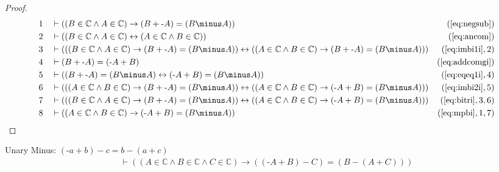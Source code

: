 \begin{proof}
\begin{align}
  1 &&  & \vdash ( ( B \in \mathbb{C} \wedge A \in \mathbb{C} ) \rightarrow ( B + \textrm{-} A ) = ( B \minus A ) )&(\mbox{\ref{eq:negsub}})\notag
  \\ 2 &&  & \vdash ( ( B \in \mathbb{C} \wedge A \in \mathbb{C} ) \leftrightarrow ( A \in \mathbb{C} \wedge B \in \mathbb{C} ) )&(\mbox{\ref{eq:ancom}})\notag
  \\ 3 &&  & \vdash ( ( ( B \in \mathbb{C} \wedge A \in \mathbb{C} ) \rightarrow ( B + \textrm{-} A ) = ( B \minus A ) ) \leftrightarrow ( ( A \in \mathbb{C} \wedge B \in \mathbb{C} ) \rightarrow ( B + \textrm{-} A ) = ( B \minus A ) ) )&(\mbox{\ref{eq:imbi1i}},2)\notag
  \\ 4 &&  & \vdash ( B + \textrm{-} A ) = ( \textrm{-} A + B )&(\mbox{\ref{eq:addcomgi}})\notag
  \\ 5 &&  & \vdash ( ( B + \textrm{-} A ) = ( B \minus A ) \leftrightarrow ( \textrm{-} A + B ) = ( B \minus A ) )&(\mbox{\ref{eq:eqeq1i}},4)\notag
  \\ 6 &&  & \vdash ( ( ( A \in \mathbb{C} \wedge B \in \mathbb{C} ) \rightarrow ( B + \textrm{-} A ) = ( B \minus A ) ) \leftrightarrow ( ( A \in \mathbb{C} \wedge B \in \mathbb{C} ) \rightarrow ( \textrm{-} A + B ) = ( B \minus A ) ) )&(\mbox{\ref{eq:imbi2i}},5)\notag
  \\ 7 &&  & \vdash ( ( ( B \in \mathbb{C} \wedge A \in \mathbb{C} ) \rightarrow ( B + \textrm{-} A ) = ( B \minus A ) ) \leftrightarrow ( ( A \in \mathbb{C} \wedge B \in \mathbb{C} ) \rightarrow ( \textrm{-} A + B ) = ( B \minus A ) ) )&(\mbox{\ref{eq:bitri}},3,6)\notag
  \\ 8 &&  & \vdash ( ( A \in \mathbb{C} \wedge B \in \mathbb{C} ) \rightarrow ( \textrm{-} A + B ) = ( B \minus A ) )&(\mbox{\ref{eq:mpbi}},1,7)\notag
\end{align}
\end{proof}

\begin{lemma} Unary Minus: $( \textrm{-} a + b )
\minus c = b \minus ( a + c )$
\begin{align}
\vdash ( ( A \in \mathbb{C} \wedge B \in \mathbb{C} \wedge C \in \mathbb{C} )
    \rightarrow ( ( \textrm{-} A + B ) \minus C ) = ( B \minus ( A + C ) )
    )\label{eq:bl.uaddsub}\tag{bl.uaddsub}
\end{align}
\end{lemma}

